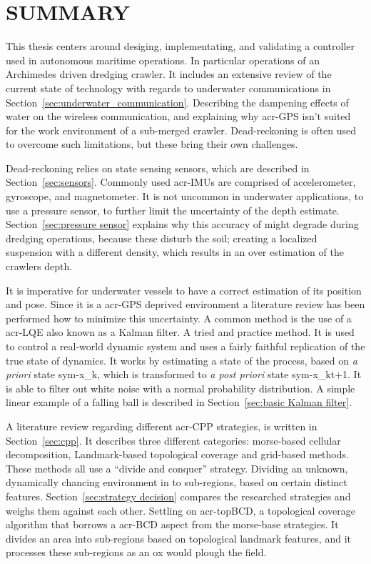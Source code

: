 

\chapter{SUMMARY}\label{chap:sum}

This thesis centers around desiging, implementating, and validating a controller used in autonomous maritime 
operations. In particular operations of an Archimedes driven dredging crawler. It includes an extensive review of the
current state of technology with regards to underwater communications in Section~\ref{sec:underwater_communication}. 
Describing the dampening effects of water on the wireless communication, and explaining why \gls{acr-GPS} isn't 
suited for the work environment of a sub-merged crawler. Dead-reckoning is often used to overcome such limitations, 
but these bring their own challenges.

Dead-reckoning relies on state sensing sensors, which are described in Section~\ref{sec:sensors}. Commonly used 
\glspl{acr-IMU} are comprised of accelerometer, gyroscope, and magnetometer. It is not uncommon in underwater 
applications, to use a pressure sensor, to further limit the uncertainty of the depth estimate. 
Section~\ref{sec:pressure sensor} explains why this accuracy of might degrade during dredging operations, because 
these disturb the soil; creating a localized suspension with a different density, which results in an over estimation
of the crawlers depth.

It is imperative for underwater vessels to have a correct estimation of its position and pose. Since it is a 
\gls{acr-GPS} deprived environment a literature review has been performed how to minimize this uncertainty. A common 
method is the use of a \gls{acr-LQE} also known as a Kalman filter. A tried and practice method. It is used to 
control a real-world dynamic system and uses a fairly faithful replication of the true state of dynamics. It works by
estimating a state of the process, based on \textit{a priori} state \gls{sym-x_k}, which is transformed to \textit{a 
post priori} state \gls{sym-x_kt+1}. It is able to filter out white noise with a normal probability distribution. A 
simple linear example of a falling ball is described in Section~\ref{sec:basic Kalman filter}.

A literature review regarding different \gls{acr-CPP} strategies, is written in Section~\ref{sec:cpp}. It describes 
three
different categories: morse-based cellular decomposition, Landmark-based topological coverage
and grid-based methods. These methods all use a ``divide and conquer'' strategy. Dividing an unknown, dynamically
chancing environment in to sub-regions, based on certain distinct features. Section~\ref{sec:strategy decision}
compares the researched strategies and weighs them against each other. Settling on \gls{acr-topBCD}, a topological
coverage algorithm that borrows a \gls{acr-BCD} aspect from the morse-base strategies. It divides an area into
sub-regions based on topological landmark features, and it processes these sub-regions as an ox would plough the field.

